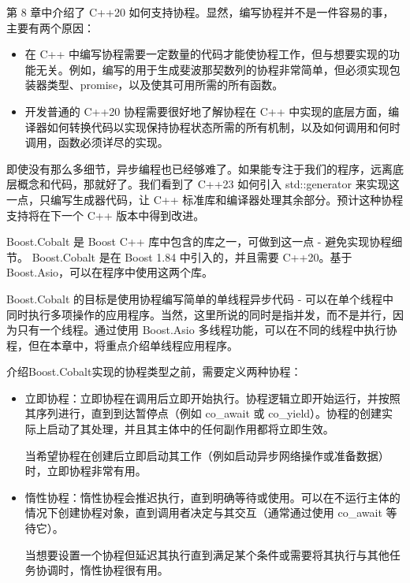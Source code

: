 
第 8 章中介绍了 C++20 如何支持协程。显然，编写协程并不是一件容易的事，主要有两个原因：

\begin{itemize}
\item
在 C++ 中编写协程需要一定数量的代码才能使协程工作，但与想要实现的功能无关。例如，编写的用于生成斐波那契数列的协程非常简单，但必须实现包装器类型、promise，以及使其可用所需的所有函数。

\item
开发普通的 C++20 协程需要很好地了解协程在 C++ 中实现的底层方面，编译器如何转换代码以实现保持协程状态所需的所有机制，以及如何调用和何时调用，函数必须详尽的实现。
\end{itemize}

即使没有那么多细节，异步编程也已经够难了。如果能专注于我们的程序，远离底层概念和代码，那就好了。我们看到了 C++23 如何引入 std::generator 来实现这一点，只编写生成器代码，让 C++ 标准库和编译器处理其余部分。预计这种协程支持将在下一个 C++ 版本中得到改进。

Boost.Cobalt 是 Boost C++ 库中包含的库之一，可做到这一点 - 避免实现协程细节。 Boost.Cobalt 是在 Boost 1.84 中引入的，并且需要 C++20。基于Boost.Asio，可以在程序中使用这两个库。

Boost.Cobalt 的目标是使用协程编写简单的单线程异步代码 - 可以在单个线程中同时执行多项操作的应用程序。当然，这里所说的同时是指并发，而不是并行，因为只有一个线程。通过使用 Boost.Asio 多线程功能，可以在不同的线程中执行协程，但在本章中，将重点介绍单线程应用程序。


介绍Boost.Cobalt实现的协程类型之前，需要定义两种协程：

\begin{itemize}
\item
立即协程：立即协程在调用后立即开始执行。协程逻辑立即开始运行，并按照其序列进行，直到到达暂停点（例如 co\_await 或 co\_yield）。协程的创建实际上启动了其处理，并且其主体中的任何副作用都将立即生效。

当希望协程在创建后立即启动其工作（例如启动异步网络操作或准备数据）时，立即协程非常有用。

\item
惰性协程：惰性协程会推迟执行，直到明确等待或使用。可以在不运行主体的情况下创建协程对象，直到调用者决定与其交互（通常通过使用 co\_await 等待它）。

当想要设置一个协程但延迟其执行直到满足某个条件或需要将其执行与其他任务协调时，惰性协程很有用。
\end{itemize}

